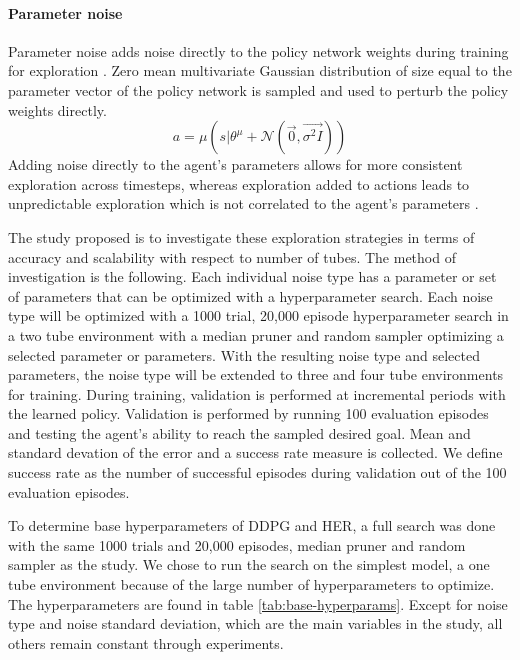\paragraph{Parameter noise}
Parameter noise adds noise directly to the policy network weights during training for exploration \cite{plappert2017parameter}. Zero mean multivariate Gaussian distribution of size equal to the parameter vector of the policy network is sampled and used to perturb the policy weights directly.
\begin{equation}
    a = \mu(s | \theta^{\mu} + \mathcal{N} (\Vec{0}, \Vec{\sigma^2 I})) \label{eqn:action-param-noise}
\end{equation}
Adding noise directly to the agent's parameters allows for more consistent exploration across timesteps, whereas exploration added to actions leads to unpredictable exploration which is not correlated to the agent's parameters \cite{plappert2017parameter}.

The study proposed is to investigate these exploration strategies in terms of accuracy and scalability with respect to number of tubes. The method of investigation is the following. Each individual noise type has a parameter or set of parameters that can be optimized with a hyperparameter search. Each noise type will be optimized with a 1000 trial, 20,000 episode hyperparameter search in a two tube environment with a median pruner and random sampler optimizing a selected parameter or parameters. With the resulting noise type and selected parameters, the noise type will be extended to three and four tube environments for training. During training, validation is performed at incremental periods with the learned policy. Validation is performed by running 100 evaluation episodes and testing the agent's ability to reach the sampled desired goal. Mean and standard devation of the error and a success rate measure is collected. We define success rate as the number of successful episodes during validation out of the 100 evaluation episodes.

To determine base hyperparameters of DDPG and HER, a full search was done with the same 1000 trials and 20,000 episodes, median pruner and random sampler as the study. We chose to run the search on the simplest model, a one tube environment because of the large number of hyperparameters to optimize. The hyperparameters are found in table \ref{tab:base-hyperparams}. Except for noise type and noise standard deviation, which are the main variables in the study, all others remain constant through experiments.

